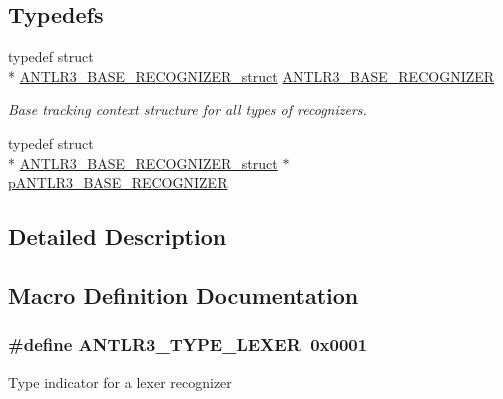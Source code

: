 \subsection*{Typedefs}
\begin{DoxyCompactItemize}
\item 
typedef struct \\*
\hyperlink{struct_a_n_t_l_r3___b_a_s_e___r_e_c_o_g_n_i_z_e_r__struct}{A\-N\-T\-L\-R3\-\_\-\-B\-A\-S\-E\-\_\-\-R\-E\-C\-O\-G\-N\-I\-Z\-E\-R\-\_\-struct} \hyperlink{group___a_n_t_l_r3___b_a_s_e___r_e_c_o_g_n_i_z_e_r_gac1374f941ff00f5709ca1e682d9f8e43}{A\-N\-T\-L\-R3\-\_\-\-B\-A\-S\-E\-\_\-\-R\-E\-C\-O\-G\-N\-I\-Z\-E\-R}
\begin{DoxyCompactList}\small\item\em Base tracking context structure for all types of recognizers. \end{DoxyCompactList}\item 
typedef struct \\*
\hyperlink{struct_a_n_t_l_r3___b_a_s_e___r_e_c_o_g_n_i_z_e_r__struct}{A\-N\-T\-L\-R3\-\_\-\-B\-A\-S\-E\-\_\-\-R\-E\-C\-O\-G\-N\-I\-Z\-E\-R\-\_\-struct} $\ast$ \hyperlink{group___a_n_t_l_r3___b_a_s_e___r_e_c_o_g_n_i_z_e_r_ga5aeeb8dcbf65f45605ae07cbd618e24c}{p\-A\-N\-T\-L\-R3\-\_\-\-B\-A\-S\-E\-\_\-\-R\-E\-C\-O\-G\-N\-I\-Z\-E\-R}
\end{DoxyCompactItemize}


\subsection{Detailed Description}


\subsection{Macro Definition Documentation}
\hypertarget{group___a_n_t_l_r3___b_a_s_e___r_e_c_o_g_n_i_z_e_r_ga63faeec6cee4f885c4b90a6d0cc2f5b4}{
\subsubsection[{A\-N\-T\-L\-R3\-\_\-\-T\-Y\-P\-E\-\_\-\-L\-E\-X\-E\-R}]{\setlength{\rightskip}{0pt plus 5cm}\#define A\-N\-T\-L\-R3\-\_\-\-T\-Y\-P\-E\-\_\-\-L\-E\-X\-E\-R~0x0001}}\label{group___a_n_t_l_r3___b_a_s_e___r_e_c_o_g_n_i_z_e_r_ga63faeec6cee4f885c4b90a6d0cc2f5b4}
Type indicator for a lexer recognizer 


